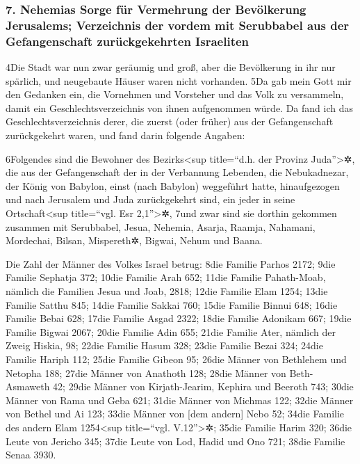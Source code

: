 \hypertarget{nehemias-sorge-fuxfcr-vermehrung-der-bevuxf6lkerung-jerusalems-verzeichnis-der-vordem-mit-serubbabel-aus-der-gefangenschaft-zuruxfcckgekehrten-israeliten}{%
\subsubsection{7. Nehemias Sorge für Vermehrung der Bevölkerung
Jerusalems; Verzeichnis der vordem mit Serubbabel aus der Gefangenschaft
zurückgekehrten
Israeliten}\label{nehemias-sorge-fuxfcr-vermehrung-der-bevuxf6lkerung-jerusalems-verzeichnis-der-vordem-mit-serubbabel-aus-der-gefangenschaft-zuruxfcckgekehrten-israeliten}}

4Die Stadt war nun zwar geräumig und groß, aber die Bevölkerung in ihr
nur spärlich, und neugebaute Häuser waren nicht vorhanden. 5Da gab mein
Gott mir den Gedanken ein, die Vornehmen und Vorsteher und das Volk zu
versammeln, damit ein Geschlechtsverzeichnis von ihnen aufgenommen
würde. Da fand ich das Geschlechtsverzeichnis derer, die zuerst (oder
früher) aus der Gefangenschaft zurückgekehrt waren, und fand darin
folgende Angaben:

6Folgendes sind die Bewohner des Bezirks\textless sup title=``d.h. der
Provinz Juda''\textgreater✲, die aus der Gefangenschaft der in der
Verbannung Lebenden, die Nebukadnezar, der König von Babylon, einst
(nach Babylon) weggeführt hatte, hinaufgezogen und nach Jerusalem und
Juda zurückgekehrt sind, ein jeder in seine Ortschaft\textless sup
title=``vgl. Esr 2,1''\textgreater✲, 7und zwar sind sie dorthin gekommen
zusammen mit Serubbabel, Jesua, Nehemia, Asarja, Raamja, Nahamani,
Mordechai, Bilsan, Mispereth✲, Bigwai, Nehum und Baana.

Die Zahl der Männer des Volkes Israel betrug: 8die Familie Parhos 2172;
9die Familie Sephatja 372; 10die Familie Arah 652; 11die Familie
Pahath-Moab, nämlich die Familien Jesua und Joab, 2818; 12die Familie
Elam 1254; 13die Familie Satthu 845; 14die Familie Sakkai 760; 15die
Familie Binnui 648; 16die Familie Bebai 628; 17die Familie Asgad 2322;
18die Familie Adonikam 667; 19die Familie Bigwai 2067; 20die Familie
Adin 655; 21die Familie Ater, nämlich der Zweig Hiskia, 98; 22die
Familie Hasum 328; 23die Familie Bezai 324; 24die Familie Hariph 112;
25die Familie Gibeon 95; 26die Männer von Bethlehem und Netopha 188;
27die Männer von Anathoth 128; 28die Männer von Beth-Asmaweth 42; 29die
Männer von Kirjath-Jearim, Kephira und Beeroth 743; 30die Männer von
Rama und Geba 621; 31die Männer von Michmas 122; 32die Männer von Bethel
und Ai 123; 33die Männer von {[}dem andern{]} Nebo 52; 34die Familie des
andern Elam 1254\textless sup title=``vgl. V.12''\textgreater✲; 35die
Familie Harim 320; 36die Leute von Jericho 345; 37die Leute von Lod,
Hadid und Ono 721; 38die Familie Senaa 3930.

